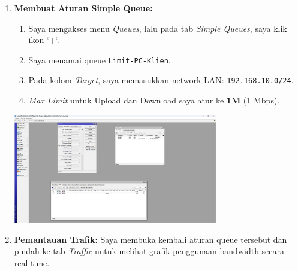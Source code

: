 \begin{enumerate}
    \item \textbf{Membuat Aturan Simple Queue:}
    \begin{enumerate}[label*=\alph*.]
        \item Saya mengakses menu \textit{Queues}, lalu pada tab \textit{Simple Queues}, saya klik ikon `+`.
        \item Saya menamai queue \texttt{Limit-PC-Klien}.
        \item Pada kolom \textit{Target}, saya memasukkan network LAN: \texttt{192.168.10.0/24}.
        \item \textit{Max Limit} untuk Upload dan Download saya atur ke \textbf{1M} (1 Mbps).
    \end{enumerate}
    \begin{center}
        \includegraphics[width=0.7\textwidth]{img5/SimpleQ.jpeg} 
    \end{center}
    
    \item \textbf{Pemantauan Trafik:} Saya membuka kembali aturan queue tersebut dan pindah ke tab \textit{Traffic} untuk melihat grafik penggunaan bandwidth secara real-time.
    

\end{enumerate}
